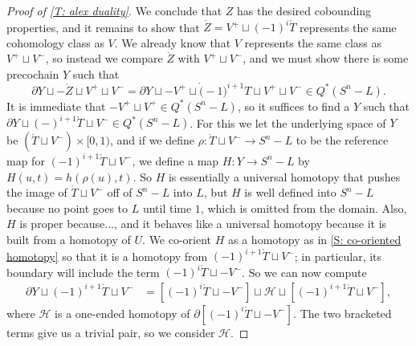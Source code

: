 \documentclass[12pt]{article}
\theoremstyle{plain}
\theoremstyle{definition}
\theoremstyle{remark}
\newcommand{\mr}[1]{\mathring{#1}}
\newcommand{\bd}{\partial}
\newcommand{\mc}[1]{\mathcal{#1}}
\begin{document}
\begin{proof}[Proof of \cref{T: alex duality}]
We conclude that $Z$ has the desired cobounding properties, and it remains to show that $\mr Z
= V^+ \sqcup (-1)^i\mr T$ represents the same cohomology class as $V$.
We already know that $V$ represents the same class as $V^+ \sqcup V^-$, so instead we compare $\mr Z$ with $V^+ \sqcup V^-$, and we must show there is some precochain $Y$ such that
$$\bd Y \sqcup -\mr Z\sqcup V^+\sqcup V^- = \bd Y \sqcup -V^+ \sqcup \mr (-1)^{i+1}T \sqcup V^+ \sqcup V^- \in Q^*(S^n-L).$$
It is immediate that $-V^+ \sqcup V^+ \in Q^*(S^n-L)$, so it suffices to find a $Y$ such that
$\bd Y \sqcup (-)^{i+1} \mr T \sqcup V^- \in Q^*(S^n-L)$.
For this we let the underlying space of $Y$ be $(\mr T \sqcup V^-) \times [0,1)$, and if we define $\rho \colon \mr T \sqcup V^- \to S^n -L$ to be the reference map for $(-1)^{i+1}\mr T \sqcup V^-$, we define a map $H \colon Y \to S^n-L$ by $H(u,t) = h(\rho(u),t)$.
So $H$ is essentially a universal homotopy that pushes the image of $\mr T \sqcup V^-$ off of $S^n-L$ into $L$, but $H$ is well defined into $S^n-L$ because no point goes to $L$ until time $1$, which is omitted from the domain.
Also, $H$ is proper because..., and it behaves like a universal homotopy because it is built from a homotopy of $U$.
We co-orient $H$ as a homotopy as in \cref{S: co-oriented homotopy} so that it is a homotopy from $(-1)^{i+1}\mr T \sqcup V^-$; in particular, its boundary will include the term $(-1)^{i}\mr T \sqcup - V^-$.
So we can now compute
\begin{align*}
\bd Y \sqcup (-1)^{i+1} \mr T \sqcup V^-
&= [(-1)^{i}\mr T \sqcup - V^-] \sqcup \mc H \sqcup [(-1)^{i+1} \mr T \sqcup V^-],
\end{align*}
where $\mc H$ is a one-ended homotopy of $\bd[ (-1)^i\mr T \sqcup - V^-]$.
The two bracketed terms give us a trivial pair, so we consider
$\mc H$.


\end{proof}
\end{document}
